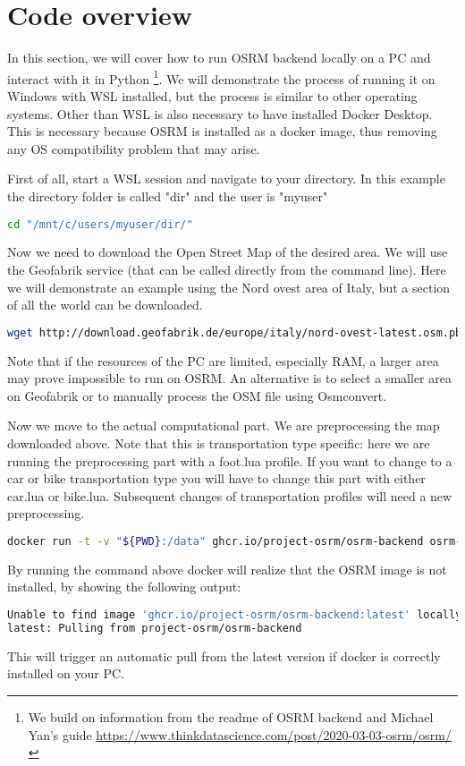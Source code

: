\documentclass[12pt]{article}
\begin{document}
\section{Code overview}
\label{code}

In this section, we will cover how to run OSRM backend locally on a PC and interact with it in Python \footnote{We build on information from the readme of OSRM backend and Michael Yan’s guide \url{https://www.thinkdatascience.com/post/2020-03-03-osrm/osrm/}}. We will demonstrate the process of running it on Windows with WSL installed, but the process is similar to other operating systems. Other than WSL is also necessary to have installed Docker Desktop. This is necessary because OSRM is installed as a docker image, thus removing any OS compatibility problem that may arise.

First of all, start a WSL session and navigate to your directory. In this example the directory folder is called "dir" and the user is "myuser"
\begin{lstlisting}[language=bash]
cd "/mnt/c/users/myuser/dir/"
\end{lstlisting}

Now we need to download the Open Street Map of the desired area. We will use the Geofabrik service (that can be called directly from the command line). Here we will demonstrate an example using the Nord ovest area of Italy, but a section of all the world can be downloaded. 
\begin{lstlisting}[language=bash, breaklines=true]
wget http://download.geofabrik.de/europe/italy/nord-ovest-latest.osm.pbf
\end{lstlisting}
Note that if the resources of the PC are limited, especially RAM, a larger area may prove impossible to run on OSRM. An alternative is to select a smaller area on Geofabrik or to manually process the OSM file using Osmconvert. 

Now we move to the actual computational part. We are preprocessing the map downloaded above. Note that this is transportation type specific: here we are running the preprocessing part with a foot.lua profile. If you want to change to a car or bike transportation type you will have to change this part with either car.lua or bike.lua. Subsequent changes of transportation profiles will need a new preprocessing.
\begin{lstlisting}[language=bash, breaklines=true]
docker run -t -v "${PWD}:/data" ghcr.io/project-osrm/osrm-backend osrm-extract -p /opt/foot.lua /data/nord-ovest-latest.osm.pbf || "osrm-extract failed"
\end{lstlisting}
By running the command above docker will realize that the OSRM image is not installed, by showing the following output:
\begin{lstlisting}[language=bash, breaklines=true]
Unable to find image 'ghcr.io/project-osrm/osrm-backend:latest' locally
latest: Pulling from project-osrm/osrm-backend
\end{lstlisting}
This will trigger an automatic pull from the latest version if docker is correctly installed on your PC.
\end{document}
